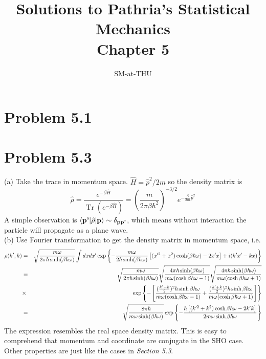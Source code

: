 \documentclass{article}
\author{SM-at-THU}
\title{\bf{Solutions to Pathria's Statistical Mechanics}\\Chapter 5}
\newcommand{\tr}{\mathop{\mathrm{Tr}}}
\begin{document}
\maketitle
\section*{Problem 5.1}

\section*{Problem 5.3}
(a) Take the trace in momentum space. $\hat{H} = \hat{p}^{2}/2m$ so the density matrix is
\begin{equation}
\hat{\rho} = \frac{e^{-\beta \hat{H}}}{\tr (e^{-\beta \hat{H}})} = (\frac{m}{2\pi \beta \hbar^{2}})^{-3/2}e^{-\frac{\beta}{2m} \hat{p}^{2} }
\end{equation}
A simple observation is $\braket{\textbf{p'}|\hat{\rho}|\textbf{p}} \sim \delta_{\textbf{p}\textbf{p'}}$, which means without interaction the particle will propagate as a plane wave.\\
(b) Use Fourier transformation to get the density matrix in momentum space, i.e.
\begin{eqnarray}
\rho(k',k) &=& \sqrt{\frac{m \omega}{2 \pi \hbar \sinh (\beta \hbar \omega)}}\int dx dx' \exp \left\{
- \frac{m \omega}{2 \hbar \sinh (\beta \hbar \omega)} \left[(x'^{2} +x^{2}) \cosh (\beta \hbar \omega) -2 x' x \right] + i(k'x' - kx)
 \right\} \notag \\
&=& \sqrt{\frac{m \omega}{2 \pi \hbar \sinh (\beta \hbar \omega)}} \sqrt{\frac{4 \pi \hbar \sinh (\beta \hbar \omega)}{m \omega (\cosh \beta \hbar \omega -1 )}} \sqrt{\frac{4 \pi \hbar \sinh (\beta \hbar \omega)}{m \omega (\cosh \beta \hbar \omega +1 )}} \notag \\
&\times& \exp \left\{-\left[ \frac{(\frac{k'-k}{2})^{2} \hbar \sinh \beta \hbar \omega}{m \omega (\cosh \beta \hbar \omega -1)} + \frac{(\frac{k'+k}{2})^{2} \hbar \sinh \beta \hbar \omega}{m \omega (\cosh \beta \hbar \omega +1)}
 \right] \right\} \notag \\
&=& \sqrt{\frac{8 \pi \hbar }{m \omega \sinh (\beta \hbar \omega)}} \exp \left\{ - \frac{\hbar\left[ (k'^{2}+k^{2}) \cosh \beta \hbar \omega - 2k'k\right]}{2 m \omega \sinh \beta \hbar \omega}
\right\}
\end{eqnarray}
The expression resembles the real space density matrix. This is easy to comprehend that momentum and coordinate are conjugate in the SHO case. Other properties are just like the cases in \emph{Section 5.3}.
\end{document}
